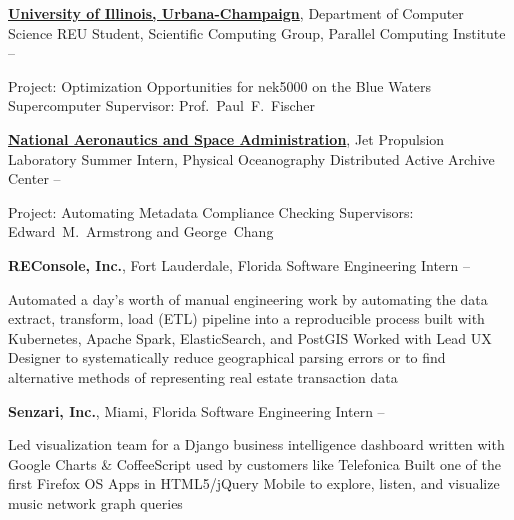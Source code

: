 \documentclass[letterpaper,MMMyyyy,nonstopmode]{simpleresumecv}
\begin{document}
\begin{Body}
\Entry
\href{http://illinois.edu/}{\textbf{University of Illinois, Urbana-Champaign}}, Department of Computer Science
\Gap
\BulletItem REU Student, Scientific Computing Group, Parallel Computing Institute
\hfill {} -- 
\begin{Detail}
\SubBulletItem
Project: Optimization Opportunities for nek5000 on the Blue Waters Supercomputer
\SubBulletItem
Supervisor: Prof.~Paul~F.~Fischer
\end{Detail}

\Entry
\href{http://www.jpl.nasa.gov/}{\textbf{National Aeronautics and Space Administration}},
Jet Propulsion Laboratory
\Gap
\BulletItem Summer Intern, Physical Oceanography Distributed Active Archive Center
\hfill
{} -- 
\begin{Detail}
\SubBulletItem
Project: Automating Metadata Compliance Checking
\SubBulletItem
Supervisors: Edward~M.~Armstrong and George~Chang
\end{Detail}



\Entry
\textbf{REConsole, Inc.}, Fort Lauderdale, Florida
\Gap
\BulletItem
Software Engineering Intern
\hfill
{} -- 
\begin{Detail}
\SubBulletItem Automated a day's worth of manual engineering work by automating the data extract, transform, load (ETL) pipeline into a reproducible process built with Kubernetes, Apache Spark, ElasticSearch, and PostGIS
\SubBulletItem Worked with Lead UX Designer to systematically reduce geographical parsing errors or to find alternative methods of representing real estate transaction data
\end{Detail}

\Entry
\textbf{Senzari, Inc.}, Miami, Florida
\Gap
\BulletItem
Software Engineering Intern
\hfill
{} -- 
\begin{Detail}
\SubBulletItem Led visualization team for a Django business intelligence dashboard written with Google Charts \& CoffeeScript used by customers like Telefonica
\SubBulletItem Built one of the first Firefox OS Apps in HTML5/jQuery Mobile to explore, listen, and visualize music network graph queries
\end{Detail}


\end{Body}
\end{document}
